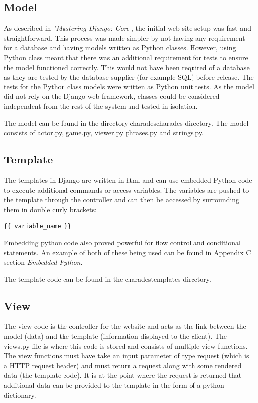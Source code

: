 \subsection{Model}
As described in \textit{"Mastering Django: Core} \cite{django_book}, the initial web site setup was fast and straightforward. This process was made simpler by not having any requirement for a database and having models written as Python classes. However, using Python class meant that there was an additional requirement for tests to ensure the model functioned correctly. This would not have been required of a database as they are tested by the database supplier (for example SQL) before release. The tests for the Python class models were written as Python unit tests. As the model did not rely on the Django web framework, classes could be considered independent from the rest of the system and tested in isolation.

The model can be found in the directory \/charades\/charades\/ directory. The model consists of actor.py, game.py, viewer.py phrases.py and strings.py.

\subsection{Template}
The templates in Django are written in html and can use embedded Python code to execute additional commands or access variables. The variables are pushed to the template through the controller and can then be accessed by surrounding them in double curly brackets:
\begin{verbatim}
{{ variable_name }}
\end{verbatim}

Embedding python code also proved powerful for flow control and conditional statements. An example of both of these being used can be found in Appendix C section \textit{Embedded Python}.

The template code can be found in the \/charades\/templates directory.

\subsection{View}
The view code is the controller for the website and acts as the link between the model (data) and the template (information displayed to the client). The views.py file is where this code is stored and consists of multiple view functions. The view functions must have take an input parameter of type request (which is a HTTP request header) and must return a request along with some rendered data (the template code). It is at the point where the request is returned that additional data can be provided to the template in the form of a python dictionary.


